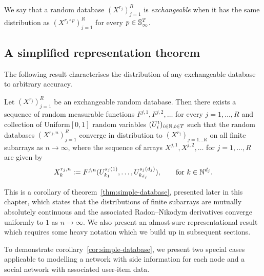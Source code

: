 \begin{definition}
We say that a random database $(X^{r_j})_{j=1}^R$ is \emph{exchangeable} when it has the same distribution as $(X^{r_j\circ p})_{j=1}^R$ for every $p \in \mathbb{S}_{\infty}^T$.
\end{definition}



\subsection{A simplified representation theorem}

The following result characterises the distribution of any exchangeable database to arbitrary accuracy.

\begin{cor}
  \label{cor:simple-database}
   Let $(X^{r_j})_{j=1}^R$ be an exchangeable random database.
   Then there exists a sequence of random measurable functions $F^{j,1}, F^{j,2}, \dotsc$ for 
   every $j=1,\ldots, R$ and collection of \iid Uniform$[0,1]$ random variables $(U^t_i)_{i\in\mathbb{N},t \in T}$ such that 
   the random databases $(X^{r_j,n})_{j=1}^R$
    converge in distribution to $(X^{r_j})_{j=1\ldots R}$ on all finite subarrays as $n\to \infty$, where   
   the sequence of arrays $X^{j,1},X^{j,2},\dotsc$ for $j = 1,\dotsc,R$ are given by
   \[
     X^{r_j,n}_{k} := F^{j,n}(U^{s_j(1)}_{k_1},\dotsc,U^{s_j(d_j)}_{k_{d_j}}), \qquad \text{for } k \in \mathbb{N}^{d_j}.
   \]
\end{cor}

This is a corollary of theorem~\ref{thm:simple-database}, presented later in this chapter, which states that the distributions of finite subarrays are mutually absolutely continuous and the associated Radon--Nikodym derivatives converge uniformly to $1$ as $n \to \infty$.
We also present an almost-sure representational result which requires some heavy notation which we build up in subsequent sections.

To demonstrate corollary~\ref{cor:simple-database}, we present two special cases applicable to modelling a network with side information for each node and a social network with associated user-item data.

